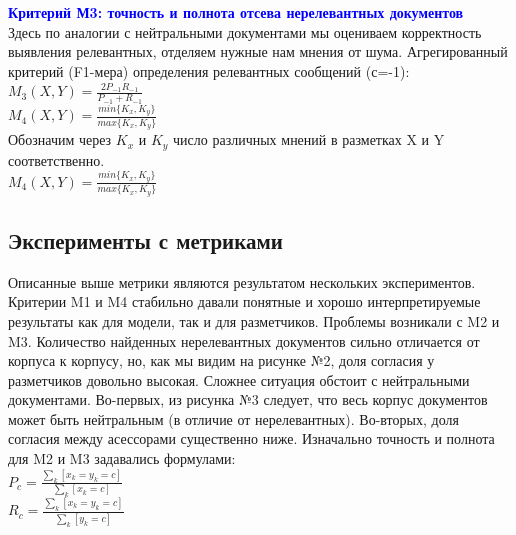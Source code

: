 \documentclass{article}
\begin{document}
\textbf{\textcolor{blue}{Критерий М3: точность и полнота отсева нерелевантных документов}}\\
Здесь по аналогии с нейтральными документами мы оцениваем корректность выявления релевантных, отделяем нужные нам мнения от шума. Агрегированный критерий (F1-мера) определения релевантных сообщений (с=-1):\\ 

\hspace{5cm}$M_3(X, Y) = \frac{2P_{-1}R_{-1}}{P_{-1}+R_{-1}}$\\

\hspace{5cm}$M_4(X, Y) = \frac{min\{K_x, K_y\}}{max\{K_x, K_y\}}$\\
Обозначим через $K_x$ и $K_y$ число различных мнений в разметках X и Y соответственно.\\

\hspace{5cm}$M_4(X, Y) = \frac{min\{K_x, K_y\}}{max\{K_x, K_y\}}$\\


\subsection{Эксперименты с метриками}
Описанные выше метрики являются результатом нескольких экспериментов. Критерии M1 и M4 стабильно давали понятные и хорошо интерпретируемые результаты как для модели, так и для разметчиков. Проблемы возникали с M2 и M3. Количество найденных нерелевантных документов сильно отличается от корпуса к корпусу, но, как мы видим на рисунке №2, доля согласия у разметчиков довольно высокая. Сложнее ситуация обстоит с нейтральными документами. Во-первых, из рисунка №3 следует, что весь корпус документов может быть нейтральным (в отличие от нерелевантных). Во-вторых, доля согласия между асессорами существенно ниже.
\label{old_metrics}
Изначально точность и полнота для M2 и M3 задавались формулами:\\

\hspace{5cm}$P_c = \frac{\sum_{k} [x_k=y_k=c]}{\sum_{k} [x_k=c]}$\\

\hspace{5cm}$R_c = \frac{\sum_{k} [x_k=y_k=c]}{\sum_{k} [y_k=c]}$\\
\end{document}
